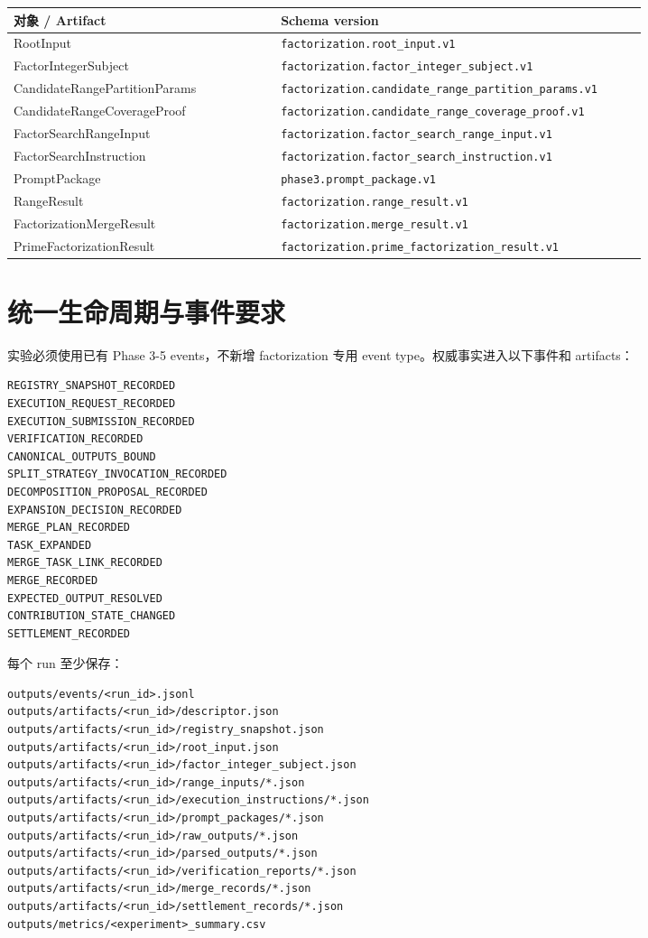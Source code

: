 \documentclass[11pt]{ctexart}
\begin{document}
\begin{longtable}{p{0.38\linewidth}p{0.52\linewidth}}
\toprule
对象 / Artifact & Schema version \\
\midrule
RootInput & \texttt{factorization.root\_input.v1} \\
FactorIntegerSubject & \texttt{factorization.factor\_integer\_subject.v1} \\
CandidateRangePartitionParams & \texttt{factorization.candidate\_range\_partition\_params.v1} \\
CandidateRangeCoverageProof & \texttt{factorization.candidate\_range\_coverage\_proof.v1} \\
FactorSearchRangeInput & \texttt{factorization.factor\_search\_range\_input.v1} \\
FactorSearchInstruction & \texttt{factorization.factor\_search\_instruction.v1} \\
PromptPackage & \texttt{phase3.prompt\_package.v1} \\
RangeResult & \texttt{factorization.range\_result.v1} \\
FactorizationMergeResult & \texttt{factorization.merge\_result.v1} \\
PrimeFactorizationResult & \texttt{factorization.prime\_factorization\_result.v1} \\
\bottomrule
\end{longtable}

\section{统一生命周期与事件要求}

实验必须使用已有 Phase 3-5 events，不新增 factorization 专用 event type。权威事实进入以下事件和 artifacts：

\begin{lstlisting}
REGISTRY_SNAPSHOT_RECORDED
EXECUTION_REQUEST_RECORDED
EXECUTION_SUBMISSION_RECORDED
VERIFICATION_RECORDED
CANONICAL_OUTPUTS_BOUND
SPLIT_STRATEGY_INVOCATION_RECORDED
DECOMPOSITION_PROPOSAL_RECORDED
EXPANSION_DECISION_RECORDED
MERGE_PLAN_RECORDED
TASK_EXPANDED
MERGE_TASK_LINK_RECORDED
MERGE_RECORDED
EXPECTED_OUTPUT_RESOLVED
CONTRIBUTION_STATE_CHANGED
SETTLEMENT_RECORDED
\end{lstlisting}

每个 run 至少保存：

\begin{lstlisting}
outputs/events/<run_id>.jsonl
outputs/artifacts/<run_id>/descriptor.json
outputs/artifacts/<run_id>/registry_snapshot.json
outputs/artifacts/<run_id>/root_input.json
outputs/artifacts/<run_id>/factor_integer_subject.json
outputs/artifacts/<run_id>/range_inputs/*.json
outputs/artifacts/<run_id>/execution_instructions/*.json
outputs/artifacts/<run_id>/prompt_packages/*.json
outputs/artifacts/<run_id>/raw_outputs/*.json
outputs/artifacts/<run_id>/parsed_outputs/*.json
outputs/artifacts/<run_id>/verification_reports/*.json
outputs/artifacts/<run_id>/merge_records/*.json
outputs/artifacts/<run_id>/settlement_records/*.json
outputs/metrics/<experiment>_summary.csv
\end{lstlisting}
\end{document}
